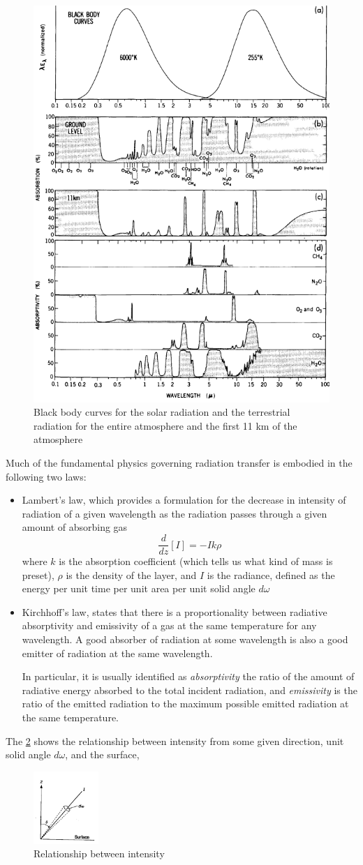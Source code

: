 \begin{figure}[htp!]
	\centering
	\includegraphics[width=0.4\linewidth]{uploads/image11.png}
	\caption{Black body curves for the solar radiation and the terrestrial radiation for the entire atmosphere and the first 11 km of the atmosphere}
	\label{fig:enter-label}
\end{figure}
Much of the fundamental physics governing radiation transfer is embodied in the following two laws:
\begin{itemize}
	\item Lambert's law, which provides a formulation for the decrease in intensity of radiation of a given wavelength as the radiation passes through a given amount of absorbing gas
	      $$\frac{d}{dz}[I]=-Ik\rho$$
	      where $k$ is the absorption coefficient (which tells us what kind of mass is preset), $\rho$ is the density of the layer, and $I$ is the radiance, defined as the energy per unit time per  unit area per unit solid angle $d\omega$

	\item Kirchhoff's law, states that there is a proportionality between radiative absorptivity and emissivity of a gas at the same temperature for any wavelength. A good absorber of radiation at some wavelength is also a good emitter of radiation at the same wavelength.

	      In particular, it is usually identified as \textit{absorptivity} the ratio of the amount of radiative energy absorbed to the total incident radiation, and \textit{emissivity} is the ratio of the emitted radiation to the maximum possible emitted radiation at the same temperature.
\end{itemize}


The \ref{fig:relat} shows the relationship between intensity from some given direction, unit solid angle $d\omega$, and the surface,
\begin{figure}
	\begin{center}
		\includegraphics[width=0.22\textwidth]{uploads/imageIw.png}
	\end{center}
	\caption{Relationship between intensity}
	\label{fig:relat}
\end{figure}

